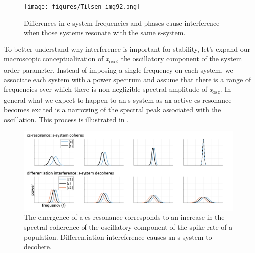   
\begin{figure}
\texttt{[image: figures/Tilsen-img92.png]}
\caption{Differences in c-system frequencies and phases cause interference when those systems resonate with the same s-system.}
\label{fig:4:42}
\end{figure}
 

  To better understand why interference is important for stability, let's expand our macroscopic conceptualization of \textit{x}\textsubscript{osc}, the oscillatory component of the system order parameter. Instead of imposing a single frequency on each system, we associate each system with a power spectrum and assume that there is a range of frequencies over which there is non-negligible spectral amplitude of \textit{x}\textsubscript{osc}. In general what we expect to happen to an s-system as an active cs-resonance becomes excited is a narrowing of the spectral peak associated with the oscillation. This process is illustrated in {}.

  
\begin{figure}
\includegraphics[width=\textwidth]{figures/Tilsen-img93.png}
\caption{The emergence of a cs-resonance corresponds to an increase in the spectral coherence of the oscillatory component of the spike rate of a population. Differentiation intereference causes an s-system to decohere.}
\label{fig:4:43}
\end{figure}
 

